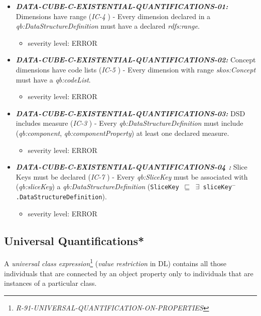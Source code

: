 \documentclass{llncs}
\newcommand{\ms}[1]{\texttt{#1}}
\begin{document}
\begin{itemize}
	\item \textbf{{\em DATA-CUBE-C-EXISTENTIAL-QUANTIFICATIONS-01:}}
	Dimensions have range (\emph{IC-4} \cite{CyganiakReynolds2014}) - 
	Every dimension declared in a \emph{qb:DataStructureDefinition} must have a declared \emph{rdfs:range}. 
	\begin{itemize}
		\item severity level: ERROR
	\end{itemize}
	\item \textbf{{\em DATA-CUBE-C-EXISTENTIAL-QUANTIFICATIONS-02:}}
	Concept dimensions have code lists (\emph{IC-5} \cite{CyganiakReynolds2014}) - 
	Every dimension with range \emph{skos:Concept} must have a \emph{qb:codeList}. 
	\begin{itemize}
		\item severity level: ERROR
	\end{itemize}
  \item \textbf{{\em DATA-CUBE-C-EXISTENTIAL-QUANTIFICATIONS-03:}}
	DSD includes measure (\emph{IC-3} \cite{CyganiakReynolds2014}) -  
	Every \emph{qb:DataStructureDefinition} must include (\emph{qb:component}, \emph{qb:componentProperty}) at least one declared measure. 
	\begin{itemize}
		\item severity level: ERROR
	\end{itemize}
	\item \textbf{{\em DATA-CUBE-C-EXISTENTIAL-QUANTIFICATIONS-04	:}}
	Slice Keys must be declared (\emph{IC-7} \cite{CyganiakReynolds2014}) -
	Every \emph{qb:SliceKey} must be associated with (\emph{qb:sliceKey}) a \emph{qb:DataStructureDefinition} (\ms{SliceKey $\sqsubseteq$ $\exists$ sliceKey$^{-}$.DataStructureDefinition}). 
	\begin{itemize}
		\item severity level: ERROR
	\end{itemize}
\end{itemize}

\subsection{Universal Quantifications*}

A \emph{universal class expression}\footnote{{\em R-91-UNIVERSAL-QUANTIFICATION-ON-PROPERTIES}} ({\em value restriction} in DL) contains all those individuals that are connected by an object property only to individuals that are instances of a particular class.
\end{document}
